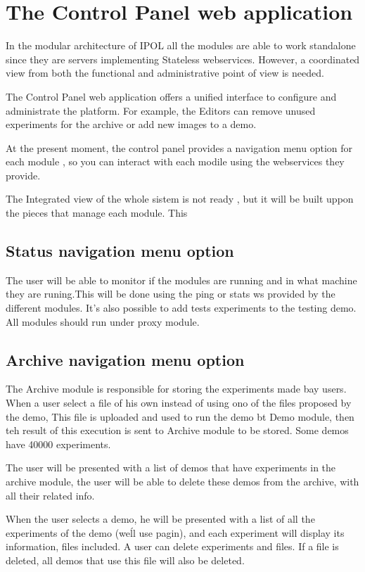 \section{The Control Panel web application}
In the modular architecture of IPOL all the modules are able to work standalone since they are servers implementing Stateless webservices. However, a coordinated view from both the functional and administrative point of view is needed.

The Control Panel web application offers a unified interface to configure and administrate the platform. For example, the Editors can remove unused experiments for the archive or add new images to a demo.

At the present moment, the control panel provides a navigation menu option for each module , 
so you can interact with each modile using the webservices they provide.

The Integrated view of the whole sistem is not ready , but it will be built uppon the pieces that manage each module. This 

\subsection{Status navigation menu option}
The user will be able to monitor if the modules are running and in what machine they are runing.This will be done using the ping or stats ws provided by the different modules.
It's also possible to add tests experiments to the testing demo.
All modules should run under proxy module.

\subsection{Archive navigation menu option}
The Archive module is responsible for storing the experiments made bay users. When a user select a file of his own instead of using ono of the files proposed by the demo, This file is uploaded and used to run the demo bt Demo module, then teh result of this execution is sent to Archive module to be stored. Some demos have 40000 experiments.

The user will be presented with a list of demos that have experiments in the archive module, the user will be able to delete these demos from the archive, with all their related info.

When the user selects a demo, he will be presented with a list of all the experiments of the demo (we\'ll use pagin), and each experiment will display its information, files included. A user can delete experiments and files. If a file is deleted, all demos that use this file will also be deleted.


